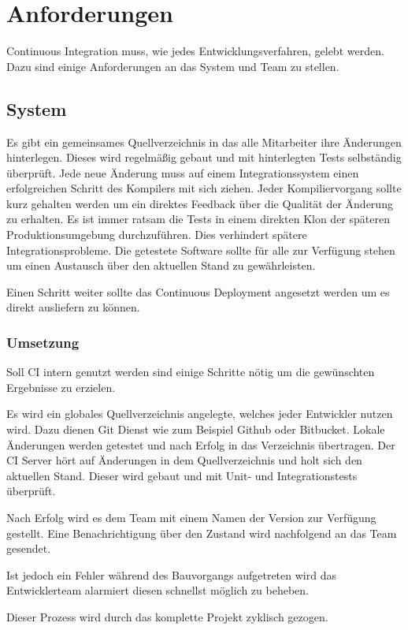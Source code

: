 \chapter{Anforderungen}
Continuous Integration muss, wie jedes Entwicklungsverfahren, gelebt werden. Dazu sind einige Anforderungen an das System und Team zu stellen.

\section{System}
Es gibt ein gemeinsames Quellverzeichnis in das alle Mitarbeiter ihre Änderungen hinterlegen. Dieses wird regelmäßig gebaut und mit hinterlegten Tests selbständig überprüft. Jede neue Änderung muss auf einem Integrationssystem einen erfolgreichen Schritt des Kompilers mit sich ziehen.
Jeder Kompiliervorgang sollte kurz gehalten werden um ein direktes Feedback über die Qualität der Änderung zu erhalten. Es ist immer ratsam die Tests in einem direkten Klon der späteren Produktionsumgebung durchzuführen. Dies verhindert spätere Integrationsprobleme. Die getestete Software sollte für alle zur Verfügung stehen um einen Austausch über den aktuellen Stand zu gewährleisten.

Einen Schritt weiter sollte das Continuous Deployment angesetzt werden um es direkt ausliefern zu können. 

\subsection{Umsetzung}
Soll CI intern genutzt werden sind einige Schritte nötig um die gewünschten Ergebnisse zu erzielen.

Es wird ein globales Quellverzeichnis angelegte, welches jeder Entwickler nutzen wird. Dazu dienen Git Dienst wie zum Beispiel Github oder Bitbucket. Lokale Änderungen werden getestet und nach Erfolg in das Verzeichnis übertragen. Der CI Server hört auf Änderungen in dem Quellverzeichnis und holt sich den aktuellen Stand. Dieser wird gebaut und mit Unit- und Integrationstests überprüft. 

Nach Erfolg wird es dem Team mit einem Namen der Version zur Verfügung gestellt. Eine Benachrichtigung über den Zustand wird nachfolgend an das Team gesendet. 

Ist jedoch ein Fehler während des Bauvorgangs aufgetreten wird das Entwicklerteam alarmiert diesen schnellst möglich zu beheben.

Dieser Prozess wird durch das komplette Projekt zyklisch gezogen.

